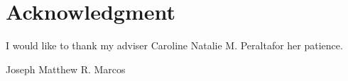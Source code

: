 \documentclass[journal]{./IEEE/IEEEtran}
\newcommand{\ADVISEE}{Joseph Matthew R. Marcos}
\newcommand{\ADVISER}{Caroline Natalie M. Peralta}
\begin{document}
\newpage
\section*{Acknowledgment}
I would like to thank my adviser \ADVISER for her patience.

\begin{biography}{\ADVISEE}
\end{biography}


\newpage
% 


\end{document}
